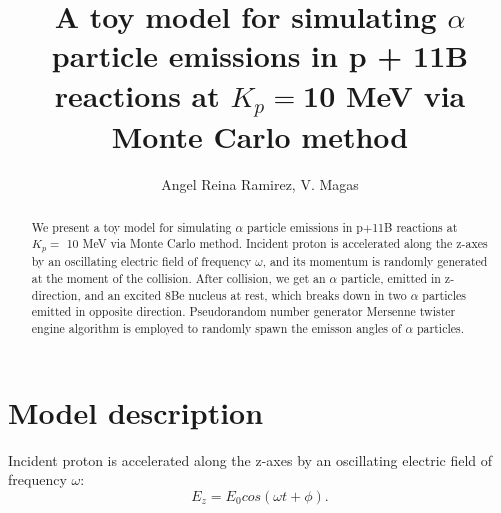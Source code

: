 \documentclass[aps,prc,twocolumn,floatfix,showpacs,a4paper,
nofootinbib,amsmath,amssymb]{revtex4}
\begin{document}
\title{A toy model for simulating $\alpha$ particle emissions in p + 11B reactions at $K_p=$10 MeV via Monte Carlo method}

\author{Angel Reina Ramirez, V. Magas}
\smallskip



\begin{abstract}
We present a toy model for simulating $\alpha$ particle emissions in p$+$11B reactions at $K_p =$ 10 MeV via Monte Carlo method.  
Incident proton is accelerated along the z-axes by an oscillating electric field of frequency $\omega$, and its momentum is randomly generated at the moment of the collision. After collision, we get an $\alpha$ particle, emitted in z-direction, and an excited 8Be nucleus at rest, which breaks down in two $\alpha$ particles emitted in opposite direction. Pseudorandom number generator Mersenne twister engine algorithm is employed to randomly spawn the emisson angles of $\alpha$ particles. 
\end{abstract}
\maketitle

\section{Model description}



Incident proton is accelerated along the z-axes by an oscillating electric field of frequency $\omega$:
\begin{equation}
E_z = E_0cos(\omega t + \phi).
\end{equation}
\end{document}
